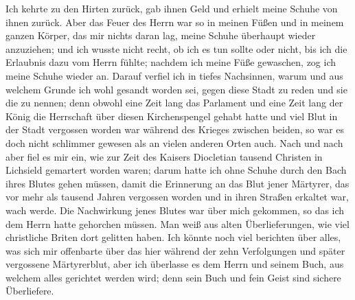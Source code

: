 Ich kehrte zu den Hirten zurück, gab ihnen
Geld und erhielt meine Schuhe von ihnen zurück. Aber das
Feuer des Herrn war so in meinen Füßen und in meinem ganzen
Körper, das mir nichts daran lag, meine Schuhe überhaupt wieder
anzuziehen; und ich wusste nicht recht, ob ich es tun sollte oder
nicht, bis ich die Erlaubnis dazu vom Herrn fühlte; nachdem ich
meine Füße gewaschen, zog ich meine Schuhe wieder an. Darauf
verfiel ich in tiefes Nachsinnen, warum und aus welchem Grunde
ich wohl gesandt worden sei, gegen diese Stadt zu reden und sie
die  zu nennen; denn obwohl eine Zeit lang das
Parlament und eine Zeit lang der König die Herrschaft über diesen
Kirchenspengel gehabt hatte und viel Blut in der Stadt vergossen
worden war während des Krieges zwischen beiden, so war es
doch nicht schlimmer gewesen als an vielen anderen Orten auch.
Nach und nach aber fiel es mir ein, wie zur Zeit des Kaisers
Diocletian tausend 
Christen in Lichsield gemartert worden waren;
darum hatte ich ohne Schuhe durch den Bach ihres Blutes gehen
müssen, damit die Erinnerung an 
das Blut jener Märtyrer, das
vor mehr als tausend Jahren vergossen worden und in ihren
Straßen erkaltet war, wach werde. Die Nachwirkung jenes Blutes
war über mich gekommen, so das ich dem Herrn hatte gehorchen
müssen. Man weiß aus alten Überlieferungen, wie viel 
christliche Briten dort gelitten haben. Ich könnte noch viel berichten
über alles, was sich mir offenbarte über das hier während der
zehn Verfolgungen und später vergossene Märtyrerblut, aber ich
überlasse es dem Herrn und seinem Buch, aus welchem alles
gerichtet werden wird; denn sein Buch und fein Geist sind sichere
Überliefere.

